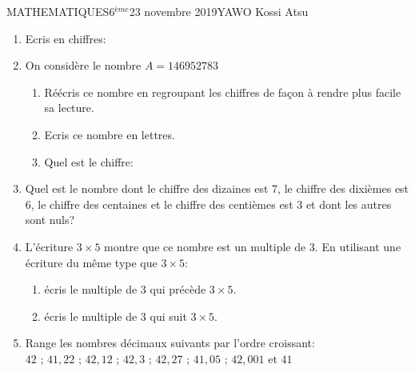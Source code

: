 \documentclass[12pt,a4paper]{book}
\newcommand{\prof}{YAWO Kossi Atsu}
\newcommand{\matiere}{MATHEMATIQUES}
\newcommand{\classe}{6$^{ème}$}
\begin{document}
\newpage

\begin{td}{\matiere}{\classe}{23 novembre 2019}{\prof}
\begin{exo}
\begin{enumerate}
\item Ecris en chiffres:
\item On considère le nombre $A=146952783$
\begin{enumerate}
\item Réécris ce nombre en regroupant les chiffres de façon à rendre plus facile sa lecture.
\item Ecris ce nombre en lettres.
\item Quel est le chiffre:
\end{enumerate}
\item Quel est le nombre dont le chiffre des dizaines est 7, le chiffre des dixièmes est 6, le chiffre des centaines et le chiffre des centièmes est 3 et dont les autres sont nuls?
\item L'écriture $3 \times 5$ montre que ce nombre est un multiple de 3. En utilisant une écriture du même type que $3 \times 5$:
\begin{enumerate}
\item écris le multiple de 3 qui précède $3 \times 5$.
\item écris le multiple de 3 qui suit $3 \times 5$.
\end{enumerate}
\item Range les nombres décimaux suivants par l'ordre croissant:\\
$42$ \qquad ; \qquad $41,22$ \qquad ; \qquad $42,12$ \qquad ; \qquad $42,3$ \qquad ; \qquad $42,27$ \qquad ; \qquad $41,05$ \qquad ; \qquad $42,001$ \qquad et \qquad $41$
\end{enumerate}
\end{exo}


\end{td}
\end{document}
